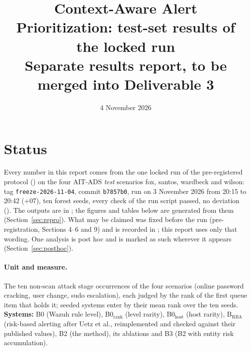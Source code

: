 \documentclass[10pt,a4paper]{article}
\title{\textbf{Context-Aware Alert Prioritization: test-set results of the locked run}\\[2pt]\large Separate results report, to be merged into Deliverable 3}
\date{4 November 2026}
\author{}
\begin{document}
\maketitle
\vspace{-2.5em}

\section*{Status}
Every number in this report comes from the one locked run of the pre-registered protocol () on the four AIT-ADS \emph{test} scenarios fox, santos, wardbeck and wilson: tag \texttt{freeze-2026-11-04}, commit \texttt{b7857b0}, run on 3 November 2026 from 20:15 to 20:42 (+07), ten forest seeds, every check of the run script passed, no deviation (). The outputs are in ; the figures and tables below are generated from them (Section~\ref{sec:repro}). What may be claimed was fixed before the run (pre-registration, Sections 4--6 and 9) and is recorded in ; this report uses only that wording. One analysis is post hoc and is marked as such wherever it appears (Section~\ref{sec:posthoc}).

\paragraph{Unit and measure.} The ten non-scan attack stage occurrences of the four scenarios (online password cracking, user change, sudo escalation), each judged by the rank of the first queue item that holds it; seeded systems enter by their mean rank over the ten seeds. \textbf{Systems:} B0 (Wazuh rule level), B0$_\mathrm{rank}$ (level rarity), B0$_\mathrm{host}$ (host rarity), B$_\mathrm{RBA}$ (risk-based alerting after Uetz et al., reimplemented and checked against their published values), B2 (the method), its ablations and B3 (B2 with entity risk accumulation).
\end{document}
